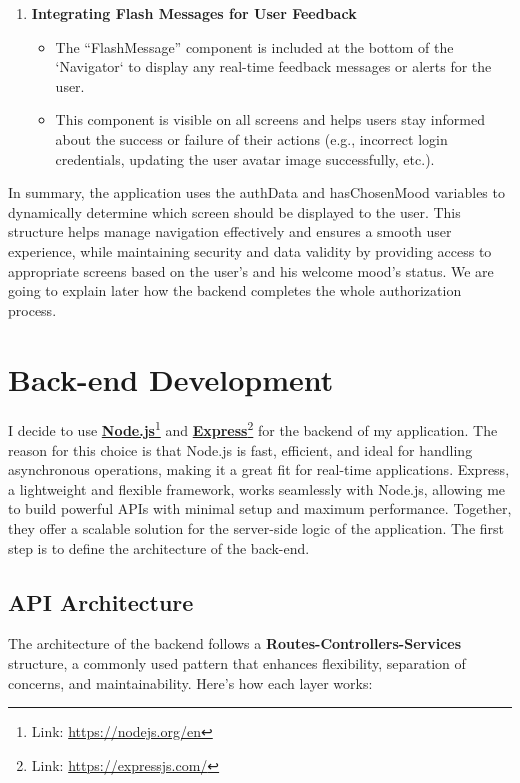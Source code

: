 \begin{enumerate}
\item \textbf{Integrating Flash Messages for User Feedback}
\begin{itemize}
    \item The ``FlashMessage'' component is included at the bottom of the `Navigator` to display any real-time feedback messages or alerts for the user.
    \item This component is visible on all screens and helps users stay informed about the success or failure of their actions (e.g., incorrect login credentials, updating the user avatar image successfully, etc.).
\end{itemize}
\end{enumerate}

\noindent In summary, the application uses the authData and hasChosenMood variables to dynamically determine which screen should be displayed to the user. This structure helps manage navigation effectively and ensures a smooth user experience, while maintaining security and data validity by providing access to appropriate screens based on the user’s and his welcome mood's status. We are going to explain later how the backend completes the whole authorization process.

\section{Back-end Development}

I decide to use \textbf{\href{https://nodejs.org/en}{Node.js}}\footnote{Link: \url{https://nodejs.org/en}} and \textbf{\href{https://expressjs.com/}{Express}}\footnote{Link: \url{https://expressjs.com/}} for the backend of my application. The reason for this choice is that Node.js is fast, efficient, and ideal for handling asynchronous operations, making it a great fit for real-time applications. Express, a lightweight and flexible framework, works seamlessly with Node.js, allowing me to build powerful APIs with minimal setup and maximum performance. Together, they offer a scalable solution for the server-side logic of the application. The first step is to define the architecture of the back-end.

\subsection{API Architecture}

The architecture of the backend follows a \textbf{Routes-Controllers-Services} structure, a commonly used pattern that enhances flexibility, separation of concerns, and maintainability. Here’s how each layer works:

